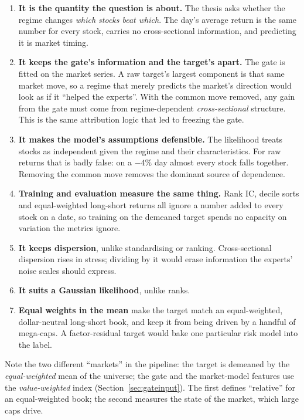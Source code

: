 \begin{whybox}
\begin{enumerate}
\item \textbf{It is the quantity the question is about.} The thesis asks whether the regime changes
  \emph{which stocks beat which}. The day's average return is the same number for every stock, carries no
  cross-sectional information, and predicting it is market timing.
\item \textbf{It keeps the gate's information and the target's apart.} The gate is fitted on the market
  series. A raw target's largest component is that same market move, so a regime that merely predicts the
  market's direction would look as if it ``helped the experts''. With the common move removed, any gain
  from the gate must come from regime-dependent \emph{cross-sectional} structure. This is the same
  attribution logic that led to freezing the gate.
\item \textbf{It makes the model's assumptions defensible.} The likelihood treats stocks as independent given
  the regime and their characteristics. For raw returns that is badly false: on a $-4\%$ day almost every
  stock falls together. Removing the common move removes the dominant source of dependence.
\item \textbf{Training and evaluation measure the same thing.} Rank IC, decile sorts and equal-weighted
  long-short returns all ignore a number added to every stock on a date, so training on the demeaned
  target spends no capacity on variation the metrics ignore.
\item \textbf{It keeps dispersion}, unlike standardising or ranking. Cross-sectional dispersion rises in stress;
  dividing by it would erase information the experts' noise scales should express.
\item \textbf{It suits a Gaussian likelihood}, unlike ranks.
\item \textbf{Equal weights in the mean} make the target match an equal-weighted, dollar-neutral long-short
  book, and keep it from being driven by a handful of mega-caps. A factor-residual target would bake one
  particular risk model into the label.
\end{enumerate}
\end{whybox}

Note the two different ``markets'' in the pipeline: the target is demeaned by the
\emph{equal-weighted} mean of the universe; the gate and the market-model features use the
\emph{value-weighted} index (Section~\ref{sec:gateinput}). The first defines ``relative'' for an
equal-weighted book; the second measures the state of the market, which large caps drive.
